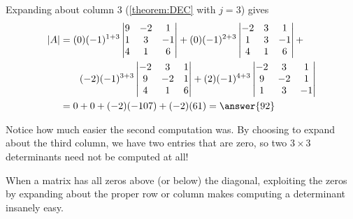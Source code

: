 \documentclass{ximera}
\begin{document}
\begin{example}
  Expanding about column 3 (\ref{theorem:DEC} with $j=3$) gives
  \begin{align*}
    \detbars{A}
    &=
      (0)(-1)^{1+3}
      \begin{vmatrix}
        9 & -2 & 1\\
        1 & 3 & -1\\
        4 & 1 & 6
      \end{vmatrix}
                +
                (0)(-1)^{2+3}
                \begin{vmatrix}
                  -2 & 3 & 1\\
                  1 & 3 & -1\\
                  4 & 1 & 6
                \end{vmatrix}
                          +\\
    &\quad\quad(-2)(-1)^{3+3}
      \begin{vmatrix}
        -2 & 3 & 1\\
        9 & -2 & 1\\
        4 & 1 & 6
      \end{vmatrix}
                +
                (2)(-1)^{4+3}
                \begin{vmatrix}
                  -2 & 3 & 1\\
                  9 & -2 & 1\\
                  1 & 3 & -1
                \end{vmatrix}\\
    &=0+0+(-2)(-107)+(-2)(61)=\answer{92}
  \end{align*}

  Notice how much easier the second computation was.  By choosing to
  expand about the third column, we have two entries that are zero, so
  two $3\times 3$ determinants need not be computed at all!
\end{example}

When a matrix has all zeros above (or below) the diagonal, exploiting
the zeros by expanding about the proper row or column makes computing
a determinant insanely easy.
\end{document}
